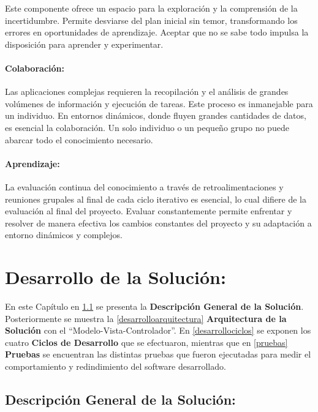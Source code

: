 \documentclass[
  12pt,
  openany]{book}
\begin{document}
Este componente ofrece un espacio para la exploración y la comprensión de la incertidumbre. Permite desviarse del plan inicial sin temor, transformando los errores en oportunidades de aprendizaje. Aceptar que no se sabe todo impulsa la disposición para aprender y experimentar.

\hypertarget{colaboraciuxf3n}{%
\subsubsection{\texorpdfstring{\textbf{Colaboración:}}{Colaboración:}}\label{colaboraciuxf3n}}

Las aplicaciones complejas requieren la recopilación y el análisis de grandes volúmenes de información y ejecución de tareas. Este proceso es inmanejable para un individuo. En entornos dinámicos, donde fluyen grandes cantidades de datos, es esencial la colaboración. Un solo individuo o un pequeño grupo no puede abarcar todo el conocimiento necesario.

\hypertarget{aprendizaje}{%
\subsubsection{\texorpdfstring{\textbf{Aprendizaje:}}{Aprendizaje:}}\label{aprendizaje}}

La evaluación continua del conocimiento a través de retroalimentaciones y reuniones grupales al final de cada ciclo iterativo es esencial, lo cual difiere de la evaluación al final del proyecto. Evaluar constantemente permite enfrentar y resolver de manera efectiva los cambios constantes del proyecto y su adaptación a entorno dinámicos y complejos.

\hypertarget{desarrollo}{%
\chapter{Desarrollo de la Solución:}\label{desarrollo}}

En este Capítulo en \ref{desarollodescripcion} se presenta la \textbf{Descripción General de la Solución}. Posteriormente se muestra la \ref{desarrolloarquitectura} \textbf{Arquitectura de la Solución} con el ``Modelo-Vista-Controlador''. En \ref{desarrollociclos} se exponen los cuatro \textbf{Ciclos de Desarrollo} que se efectuaron, mientras que en \ref{pruebas} \textbf{Pruebas} se encuentran las distintas pruebas que fueron ejecutadas para medir el comportamiento y redindimiento del software desarrollado.

\hypertarget{desarollodescripcion}{%
\section{Descripción General de la Solución:}\label{desarollodescripcion}}
\end{document}
